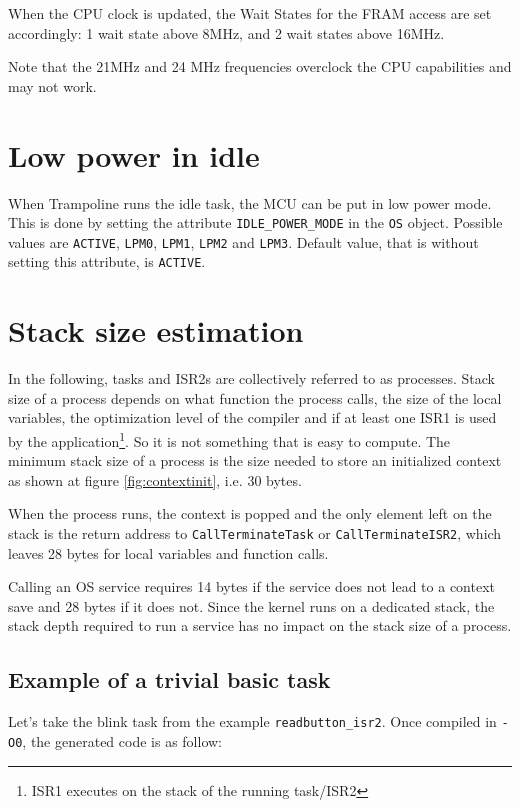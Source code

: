 \documentclass[11pt, oneside]{article}   	%
\begin{document}
When the CPU clock is updated, the Wait States for the FRAM access are set accordingly: 1 wait state above 8MHz, and 2 wait states above 16MHz.

Note that the 21MHz and 24 MHz frequencies overclock the CPU capabilities and may not work.

\section{Low power in idle}

When Trampoline runs the idle task, the MCU can be put in low power mode. This is done by setting the attribute \lstinline{IDLE_POWER_MODE} in the \lstinline{OS} object. Possible values are \lstinline{ACTIVE}, \lstinline{LPM0}, \lstinline{LPM1}, \lstinline{LPM2} and \lstinline{LPM3}. Default value, that is without setting this attribute, is \lstinline{ACTIVE}.

\section{Stack size estimation}

In the following, tasks and ISR2s are collectively referred to as processes. Stack size of a process depends on what function the process calls, the size of the local variables, the optimization level of the compiler and if at least one ISR1 is used by the application\footnote{ISR1 executes on the stack of the running task/ISR2}. So it is not something that is easy to compute. The minimum stack size of a process is the size needed to store an initialized context as shown at figure \ref{fig:contextinit}, i.e. 30 bytes.

When the process runs, the context is popped and the only element left on the stack is the return address to \lstinline{CallTerminateTask} or \lstinline{CallTerminateISR2}, which leaves 28 bytes for local variables and function calls.

Calling an OS service requires 14 bytes if the service does not lead to a context save and 28 bytes if it does not. Since the kernel runs on a dedicated stack, the stack depth required to run a service has no impact on the stack size of a process.

\subsection*{Example of a trivial basic task}

Let's take the blink task from the example \lstinline{readbutton_isr2}. Once compiled in \lstinline{-O0}, the generated code is as follow:
\end{document}
